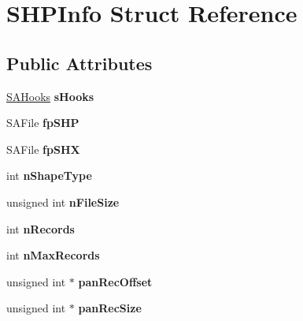 \hypertarget{structSHPInfo}{\section{S\-H\-P\-Info Struct Reference}
\label{structSHPInfo}
}
\subsection*{Public Attributes}
\begin{DoxyCompactItemize}
\item 
\hypertarget{structSHPInfo_a71b5784fdc47a8d73502b9c1156358fe}{\hyperlink{structSAHooks}{S\-A\-Hooks} {\bfseries s\-Hooks}}\label{structSHPInfo_a71b5784fdc47a8d73502b9c1156358fe}

\item 
\hypertarget{structSHPInfo_a1d98f508fc20ee2735d4c022706bd49c}{S\-A\-File {\bfseries fp\-S\-H\-P}}\label{structSHPInfo_a1d98f508fc20ee2735d4c022706bd49c}

\item 
\hypertarget{structSHPInfo_a1337214bf9a4b5f922d03632446de801}{S\-A\-File {\bfseries fp\-S\-H\-X}}\label{structSHPInfo_a1337214bf9a4b5f922d03632446de801}

\item 
\hypertarget{structSHPInfo_a162addd7eeff9f8d528adf26eabc3b34}{int {\bfseries n\-Shape\-Type}}\label{structSHPInfo_a162addd7eeff9f8d528adf26eabc3b34}

\item 
\hypertarget{structSHPInfo_aa6009c53c49e73fecb307c82360e97a7}{unsigned int {\bfseries n\-File\-Size}}\label{structSHPInfo_aa6009c53c49e73fecb307c82360e97a7}

\item 
\hypertarget{structSHPInfo_a75abb0736346dfd308e2619238136968}{int {\bfseries n\-Records}}\label{structSHPInfo_a75abb0736346dfd308e2619238136968}

\item 
\hypertarget{structSHPInfo_a465bb6f6d3bb58567c3b1159a0371cc5}{int {\bfseries n\-Max\-Records}}\label{structSHPInfo_a465bb6f6d3bb58567c3b1159a0371cc5}

\item 
\hypertarget{structSHPInfo_aa93a3fedbf227694d0cf81deed46213d}{unsigned int $\ast$ {\bfseries pan\-Rec\-Offset}}\label{structSHPInfo_aa93a3fedbf227694d0cf81deed46213d}

\item 
\hypertarget{structSHPInfo_a6d1a02016a2293b2232a6c1b02e9fcbc}{unsigned int $\ast$ {\bfseries pan\-Rec\-Size}}\label{structSHPInfo_a6d1a02016a2293b2232a6c1b02e9fcbc}


\end{DoxyCompactItemize}
